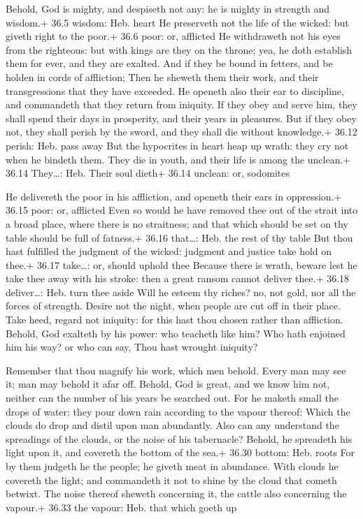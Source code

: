  Behold, God is mighty, and despiseth not any: he is mighty
in strength and wisdom.+ 36.5 wisdom: Heb. heart  He
preserveth not the life of the wicked: but giveth right to the poor.+
36.6 poor: or, afflicted  He withdraweth not his eyes from
the righteous: but with kings are they on the throne; yea, he doth
establish them for ever, and they are exalted.  And if they
be bound in fetters, and be holden in cords of affliction; 
Then he sheweth them their work, and their transgressions that they have
exceeded.  He openeth also their ear to discipline, and
commandeth that they return from iniquity.  If they obey
and serve him, they shall spend their days in prosperity, and their
years in pleasures.  But if they obey not, they shall
perish by the sword, and they shall die without knowledge.+ 36.12
perish: Heb. pass away  But the hypocrites in heart heap up
wrath: they cry not when he bindeth them.  They die in
youth, and their life is among the unclean.+ 36.14 They\ldots: Heb.
Their soul dieth+ 36.14 unclean: or, sodomites

 He delivereth the poor in his affliction, and openeth
their ears in oppression.+ 36.15 poor: or, afflicted  Even
so would he have removed thee out of the strait into a broad place,
where there is no straitness; and that which should be set on thy table
should be full of fatness.+ 36.16 that\ldots: Heb. the rest of thy table
 But thou hast fulfilled the judgment of the wicked:
judgment and justice take hold on thee.+ 36.17 take\ldots: or, should
uphold thee  Because there is wrath, beware lest he take
thee away with his stroke: then a great ransom cannot deliver thee.+
36.18 deliver\ldots: Heb. turn thee aside  Will he esteem
thy riches? no, not gold, nor all the forces of strength. 
Desire not the night, when people are cut off in their place.
 Take heed, regard not iniquity: for this hast thou chosen
rather than affliction.  Behold, God exalteth by his power:
who teacheth like him?  Who hath enjoined him his way? or
who can say, Thou hast wrought iniquity?

 Remember that thou magnify his work, which men behold.
 Every man may see it; man may behold it afar off.
 Behold, God is great, and we know him not, neither can the
number of his years be searched out.  For he maketh small
the drops of water: they pour down rain according to the vapour thereof:
 Which the clouds do drop and distil upon man abundantly.
 Also can any understand the spreadings of the clouds, or
the noise of his tabernacle?  Behold, he spreadeth his
light upon it, and covereth the bottom of the sea.+ 36.30 bottom: Heb.
roots  For by them judgeth he the people; he giveth meat in
abundance.  With clouds he covereth the light; and
commandeth it not to shine by the cloud that cometh betwixt.
 The noise thereof sheweth concerning it, the cattle also
concerning the vapour.+ 36.33 the vapour: Heb. that which goeth up

